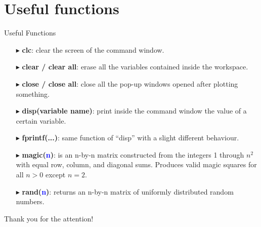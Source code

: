 \documentclass[xcolor={dvipsnames,rgb}, aspectratio=169]{beamer}
\begin{document}
\section{Useful functions}
\begin{frame}{Useful Functions}
\begin{itemize}
   \item[$\blacktriangleright$] \textbf{clc}: clear the screen of the command window.
   \item[$\blacktriangleright$] \textbf{clear / clear all}: erase all the variables
      contained inside the workspace.
   \item[$\blacktriangleright$] \textbf{close / close all}: close all the pop-up windows
      opened after plotting something.
   \item[$\blacktriangleright$] \textbf{disp(variable name)}: print inside the command
      window the value of a certain variable.
   \item[$\blacktriangleright$] \textbf{fprintf(...)}: same function of ``disp'' with a
      slight different behaviour.
   \item[$\blacktriangleright$] \textbf{magic(\textcolor{blue}{n})}: is an n-by-n matrix
      constructed from the integers 1 through $n^2$ with equal row, column, and diagonal
      sums. Produces valid magic squares for all $n > 0$ except $n = 2$.
   \item[$\blacktriangleright$] \textbf{rand(\textcolor{blue}{n})}: returns an n-by-n
      matrix of uniformly distributed random numbers.
\end{itemize}
\end{frame}

{%
   \begin{frame}[standout]
      Thank you for the attention!
   \end{frame}
}

\end{document}
